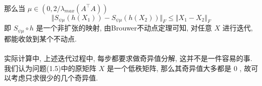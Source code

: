 \documentclass[UTF8]{ctexart}
\numberwithin{equation}{section}
\begin{document}
		\paragraph{}
			\quad 那么当 $\mu \in (0, 2/\lambda_{max}(A ^\top A))$
				\begin{equation}
					\Vert{S_{\psi \mu}(h(X_1)) - S_{\psi \mu}(h(X_2))}\Vert_F \le \Vert{X_1 - X_2}\Vert_F
				\end{equation}
			即 $S_{\psi \mu} \circ h$ 是一个非扩张的映射, 由Brouwer不动点定理可知, 对任意 $X$ 进行迭代, 都能收敛到某个不动点.

		\paragraph{}
			\quad 实际计算中, 上述迭代过程中, 每步都要求做奇异值分解, 这并不是一件容易的事. 我们认为问题(1.5)中的原矩阵 $X$ 是一个低秩矩阵, 那么其奇异值大多都是 $0$ , 故可以考虑只求很少的几个奇异值.
\end{document}
